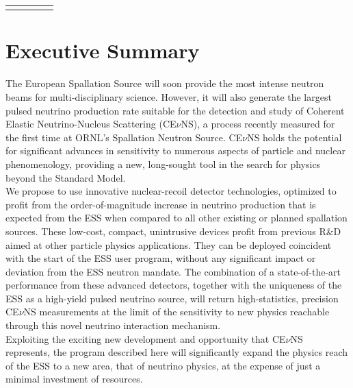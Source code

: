 \documentclass[12pt]{article}
\begin{document}
\begin{titlepage}
\begin{table}[]
\begin{tabular}{lllll}
 &                       &                                              &                                                                                         &                                                                             
\end{tabular}
\end{table}
\pagebreak


\end{titlepage}


\clearpage
\newpage
\tableofcontents
\newpage     


\section{Executive Summary}

The European Spallation Source will soon provide the most intense neutron beams for
multi-disciplinary science. However, it will also generate the
largest pulsed neutrino production rate suitable for the detection and study of Coherent
Elastic Neutrino-Nucleus Scattering (CE$\nu$NS), a process recently
measured for the first time at ORNL's Spallation Neutron Source. CE$\nu$NS holds the potential for significant advances in sensitivity to numerous aspects of particle and nuclear phenomenology, providing a new, long-sought tool in the search for physics beyond the Standard Model.\\

We propose to use innovative nuclear-recoil detector technologies, optimized to profit
from the order-of-magnitude increase in neutrino production that is expected from 
the ESS when compared to all other existing or planned spallation sources. These low-cost, compact, unintrusive devices profit from previous R\&D aimed at other particle physics applications. They can be deployed coincident with the start of the ESS user program, without any significant impact or deviation from the ESS neutron mandate. The combination of a state-of-the-art performance from these advanced detectors, together with the uniqueness of the ESS as a high-yield pulsed neutrino source, will return high-statistics, precision CE$\nu$NS
measurements at the limit of the sensitivity to new physics reachable through this novel neutrino interaction mechanism. \\

Exploiting the exciting new development and opportunity that CE$\nu$NS represents, the program described here will significantly expand the physics reach of the ESS to a new area, that of neutrino physics, at the expense of just a minimal investment of resources. 
\end{document}
